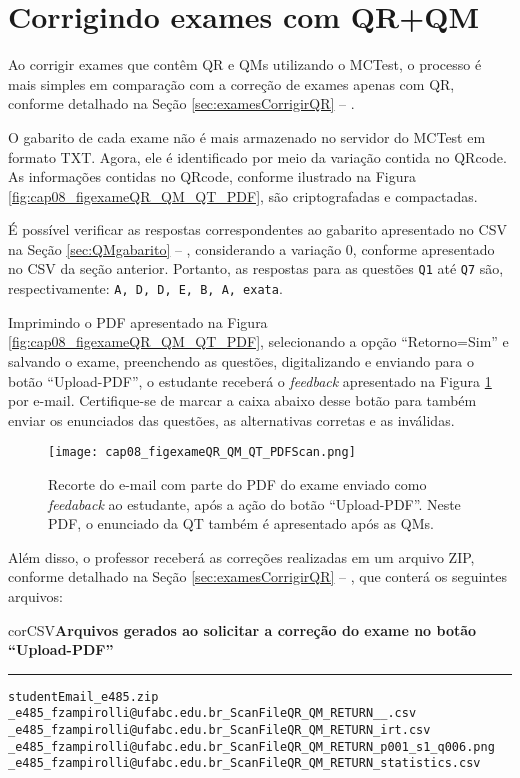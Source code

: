 \section{Corrigindo exames com QR+QM}


Ao corrigir exames que contêm QR e QMs utilizando o MCTest, o processo é mais simples em comparação com a correção de exames apenas com QR, conforme detalhado na Seção \ref{sec:examesCorrigirQR} -- .

O gabarito de cada exame não é mais armazenado no servidor do MCTest em formato TXT. Agora, ele é identificado por meio da variação contida no QRcode. As informações contidas no QRcode, conforme ilustrado na Figura \ref{fig:cap08_figexameQR_QM_QT_PDF}, são criptografadas e compactadas.

É possível verificar as respostas correspondentes ao gabarito apresentado no CSV na Seção \ref{sec:QMgabarito} -- , considerando a variação 0, conforme apresentado no CSV da seção anterior. Portanto, as respostas para as questões \verb|Q1| até \verb|Q7| são, respectivamente: \verb|A, D, D, E, B, A, exata|.

Imprimindo o PDF apresentado na Figura \ref{fig:cap08_figexameQR_QM_QT_PDF}, selecionando a opção ``Retorno=Sim'' e salvando o exame, preenchendo as questões, digitalizando e enviando para o botão ``Upload-PDF'',  o estudante receberá o \textit{feedback} apresentado na Figura \ref{fig:cap08_figexameQR_QM_QT_PDFScan} por e-mail. Certifique-se de marcar a caixa abaixo desse botão para também enviar os enunciados das questões, as alternativas corretas e as inválidas.


\begin{figure}[!ht]
  \centering
  \texttt{[image: cap08\_figexameQR\_QM\_QT\_PDFScan.png]}
   \caption{Recorte do e-mail com parte do PDF do exame enviado como \textit{feedaback} ao estudante, após a ação do botão ``Upload-PDF''. Neste PDF, o enunciado da QT também é apresentado após as QMs.}
\label{fig:cap08_figexameQR_QM_QT_PDFScan} 
\end{figure}

Além disso, o professor receberá as correções realizadas em um arquivo ZIP, conforme detalhado na Seção \ref{sec:examesCorrigirQR} -- , que conterá os seguintes arquivos:
 
\begin{myboxCode}{corCSV}{\textbf{Arquivos gerados ao solicitar a correção do exame no botão ``Upload-PDF''}}\vspace{3mm}
\hrule
\begin{verbatim}
studentEmail_e485.zip
_e485_fzampirolli@ufabc.edu.br_ScanFileQR_QM_RETURN__.csv
_e485_fzampirolli@ufabc.edu.br_ScanFileQR_QM_RETURN_irt.csv
_e485_fzampirolli@ufabc.edu.br_ScanFileQR_QM_RETURN_p001_s1_q006.png
_e485_fzampirolli@ufabc.edu.br_ScanFileQR_QM_RETURN_statistics.csv
\end{verbatim}
\end{myboxCode}

